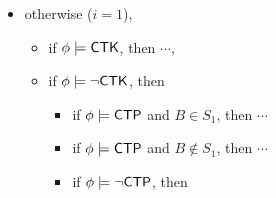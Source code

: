 {\begin{itemize}
\begin{itemize}
\begin{itemize}
\begin{itemize}
\begin{itemize}
\begin{itemize}
\begin{itemize}
                                    \item otherwise, $\rho' = \rmact(\mvtsktop(\rho, i), 2, 1)$, 
                                \end{itemize}
                                \item otherwise, $b' = \nohflag$ iff $\phi \models \nohflag$, moreover, 
                                \begin{itemize}
                                    \item if $b = \neg \nohflag$, then $\rho'=\push(\mvtsktop(\rho, i), B)$,
                                    \item otherwise, $\rho' = \rmact(\push(\mvtsktop(\rho, i), B), 2, 1)$, 
                                \end{itemize}
                           \end{itemize}
                \end{itemize}
        \end{itemize}
    \item otherwise ($i  = 1$),  
    \begin{itemize}
        \item if $\phi \models {\sf CTK}$, then $\cdots$, 
        \item if $\phi \models \neg {\sf CTK}$, then 
        \begin{itemize}
            \item if $\phi \models {\sf CTP}$ and $B \in S_1$, then $\cdots$
            \item if $\phi \models {\sf CTP}$ and $B\notin S_1$, then $\cdots$
            \item if $\phi \models \neg {\sf CTP}$, then

\end{itemize}
\end{itemize}
\end{itemize}
\end{itemize}
\end{itemize}}
